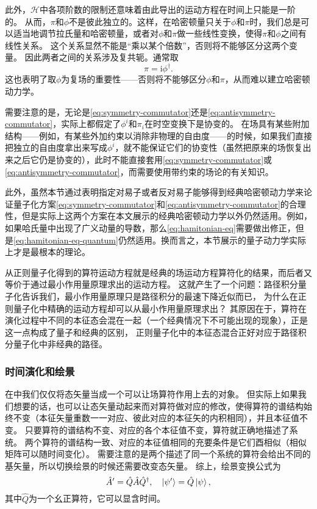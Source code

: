 \documentclass[hyperref, UTF8, a4paper]{ctexart}
\newcommand*{\ii}{\mathrm{i}}
\renewcommand{\autoref}{\prettyref}
\begin{document}
此外，$\mathcal{H}$中各项阶数的限制还意味着由此导出的运动方程在时间上只能是一阶的。
从而，$\pi$和$\phi$不是彼此独立的。这样，在哈密顿量只关于$\phi$和$\pi$时，我们总是可以适当地调节拉氏量和哈密顿量，或者对$\phi$和$\pi$做一些线性变换，使得$\pi$和$\phi$之间有线性关系。
这个关系显然不能是“乘以某个倍数”，否则将不能够区分这两个变量。
因此两者之间的关系涉及复共轭。通常取
\begin{equation}
    \pi = \ii \phi^\dagger.
\end{equation}
这也表明了取$\phi$为复场的重要性——否则将不能够区分$\phi$和$\pi$，从而难以建立哈密顿动力学。

需要注意的是，无论是\eqref{eq:symmetry-commutator}还是\eqref{eq:antisymmetry-commutator}，实际上都假定了$\phi^i$和$\pi_i$在时空变换下是协变的。
在场具有某些附加结构——例如，有某些外加约束以消除非物理的自由度——的时候，如果我们直接把独立的自由度拿出来写成$\phi^i$，就不能保证它们的协变性（虽然把原来的场恢复出来之后它仍是协变的），此时不能直接套用\eqref{eq:symmetry-commutator}或\eqref{eq:antisymmetry-commutator}，而需要使用带约束的场论的有关知识。

此外，虽然本节通过表明指定对易子或者反对易子能够得到经典哈密顿动力学来论证量子化方案\eqref{eq:symmetry-commutator}和\eqref{eq:antisymmetry-commutator}的合理性，但是实际上这两个方案在本文展示的经典哈密顿动力学以外仍然适用。例如，如果哈氏量中出现了广义动量的导数，那么\eqref{eq:hamitonian-eq}需要做出修正，但是\eqref{eq:hamitonian-eq-quantum}仍然适用。换而言之，本节展示的量子动力学实际上才是最根本的理论。

从正则量子化得到的算符运动方程就是经典的场运动方程算符化的结果，而后者又等价于通过最小作用量原理求出的运动方程。
这就产生了一个问题：路径积分量子化告诉我们，最小作用量原理只是路径积分的最速下降近似而已，
为什么在正则量子化中精确的运动方程却可以从最小作用量原理求出？
其原因在于，算符在演化过程中不同的本征态会混在一起（一个经典情况下不可能出现的现象），正是这一点构成了量子和经典的区别，
正则量子化中的本征态混合正好对应于路径积分量子化中非经典的路径。

\subsubsection{时间演化和绘景}\label{sec:time-evolution}
在\autoref{sec:canonical-quantization}中我们仅仅将态矢量当成一个可以让场算符作用上去的对象。
但实际上如果我们想要的话，也可以让态矢量动起来而对算符做对应的修改，使得算符的谱结构始终不变（本征矢量重数一一对应、彼此对应的本征矢的内积相同），并且本征值不变。
只要算符的谱结构不变、对应的各个本征值不变，算符就正确地描述了系统。
两个算符的谱结构一致、对应的本征值相同的充要条件是它们酉相似（相似矩阵可以随时间变化）。
需要注意的是两个描述了同一个系统的算符会给出不同的基矢量，所以切换绘景的时候还需要改变态矢量。
综上，绘景变换公式为
\begin{equation}
    \hat{A}' = \hat{Q} \hat{A} \hat{Q}^\dagger, \quad \ket{\psi'} = \hat{Q} \ket{\psi},
    \label{eq:picture-trans}
\end{equation}
其中$\hat{Q}$为一个幺正算符，它可以显含时间。
\end{document}
